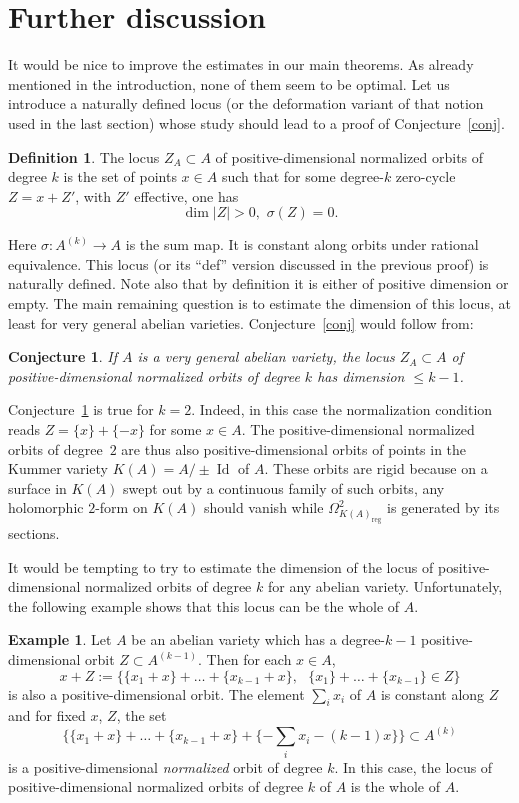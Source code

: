 \documentclass[11pt]{article}
\newtheorem{conj}[theo]{Conjecture}
\theoremstyle{definition}
\newtheorem{defi}[theo]{Definition}
\newtheorem{exam}[theo]{Example}
\numberwithin{equation}{section}
\numberwithin{figure}{section}
\numberwithin{table}{section}
\DeclareMathOperator{\Id}{Id}
\newcommand{\reg}{\mathrm{reg}}
\begin{document}
\section{Further discussion}\label{secdiscussion}

It would be nice to improve the estimates in our main theorems. As already mentioned in the introduction, none of them seem to be optimal. Let us introduce a naturally defined locus (or the deformation variant of that notion used in the last section) whose study should lead to a proof of Conjecture~\ref{conj}.

\begin{defi}
The locus $Z_A\subset A$ of positive-dimensional normalized orbits of degree $k$
is the set of points $x\in A$ such that for some degree-$k$ zero-cycle $Z=x+Z'$, with $Z'$ effective, one has
\[
\dim |Z|>0,\,\,\sigma(Z)=0.
\]
\end{defi}

Here $\sigma: A^{(k)}\rightarrow A$ is the sum map. It is constant along orbits under rational equivalence. This locus (or its ``def'' version discussed in the previous proof) is naturally defined. Note also that by definition it is either of positive dimension or empty. The main remaining question is to estimate the dimension of this locus, at least for very general abelian varieties. Conjecture~\ref{conj} would follow from:

\begin{conj}\label{conjchow}
If $A$ is a very general abelian variety, the locus $Z_A\subset A$ of positive-dimensional normalized orbits of degree $k$ has dimension $\leq k-1$.
\end{conj}

Conjecture~\ref{conjchow} is true for $k=2$. Indeed, in this case the normalization condition reads $Z=\{x\}+\{-x\}$ for some $x\in A$. The positive-dimensional normalized orbits of degree~$2$ are thus also positive-dimensional orbits of points in the Kummer variety $K(A)=A/\pm \Id$ of $A$. These orbits are rigid because on a surface in $K(A)$ swept out by a continuous family of such orbits, any holomorphic $2$-form on $K(A)$ should vanish while $\Omega^2_{K(A)_{\reg}}$ is generated by its sections.

It would be tempting to try to estimate the dimension of the locus of positive-dimensional normalized orbits of degree $k$ for any abelian variety. Unfortunately, the following example shows that this locus can be the whole of $A$.

\begin{exam}\label{exanom}
Let $A$ be an abelian variety which has a degree-$k-1$
positive-dimensional orbit $Z\subset A^{(k-1)}$. Then for each $x\in A$,
\[
x+Z:=\{\{x_1+x\}+\dots+\{x_{k-1}+x\},\,\,\,\,\{x_1\}+\dots+\{x_{k-1}\}\in Z\}
\]
is also a positive-dimensional orbit. The element $\sum_ix_i$ of $A$ is constant along $Z$
and for fixed $x$, $Z$, the set
\[
\{\{x_1+x\}+\dots+\{x_{k-1}+x\}+\{-\sum_ix_i-(k-1)x\}\}\subset A^{(k)}
\]
is a positive-dimensional \emph{normalized} orbit of degree $k$.
In this case, the locus of positive-dimensional normalized orbits of degree $k$ of $A$ is the whole of $A$.
\end{exam}
\end{document}
